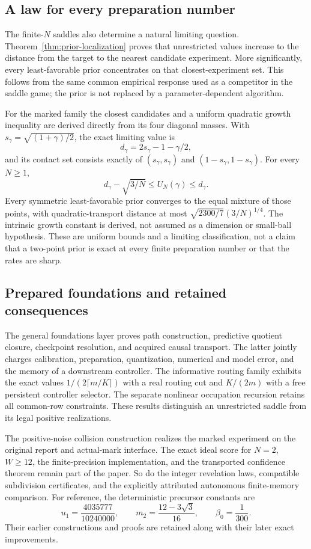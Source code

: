 \subsection{A law for every preparation number}
The finite-$N$ saddles also determine a natural limiting question.
Theorem~\ref{thm:prior-localization} proves that unrestricted values
increase to the distance from the target to the nearest candidate
experiment. More significantly, every least-favorable prior concentrates
on that closest-experiment set. This follows from the same common
empirical response used as a competitor in the saddle game; the prior
is not replaced by a parameter-dependent algorithm.

For the marked family the closest candidates and a uniform quadratic
growth inequality are derived directly from its four diagonal masses.
With $s_\gamma=\sqrt{(1+\gamma)/2}$, the exact limiting value is
\[
 d_\gamma=2s_\gamma-1-\gamma/2,
\]
and its contact set consists exactly of $(s_\gamma,s_\gamma)$ and
$(1-s_\gamma,1-s_\gamma)$. For every $N\ge1$,
\[
 d_\gamma-\sqrt{3/N}\le U_N(\gamma)\le d_\gamma.
\]
Every symmetric least-favorable prior converges to the equal mixture of
those points, with quadratic-transport distance at most
$\sqrt{2300/7}(3/N)^{1/4}$. The intrinsic growth constant is derived,
not assumed as a dimension or small-ball hypothesis. These are uniform
bounds and a limiting classification, not a claim that a two-point
prior is exact at every finite preparation number or that the rates
are sharp.

\subsection{Prepared foundations and retained consequences}
The general foundations layer proves path construction, predictive
quotient closure, checkpoint resolution, and acquired causal transport.
The latter jointly charges calibration, preparation, quantization,
numerical and model error, and the memory of a downstream controller.
The informative routing family exhibits the exact values
$1/(2\lceil m/K\rceil)$ with a real routing cut and $K/(2m)$ with a
free persistent controller selector. The separate nonlinear occupation
recursion retains all common-row constraints. These results distinguish
an unrestricted saddle from its legal positive realizations.

The positive-noise collision construction realizes the marked experiment
on the original report and actual-mark interface. The exact ideal score
for $N=2$, $W\ge12$, the finite-precision implementation, and the
transported confidence theorem remain part of the paper. So do the
integer revelation laws, compatible subdivision certificates, and the
explicitly attributed autonomous finite-memory comparison. For reference,
the deterministic precursor constants are
\begin{equation}\label{eq:constants}
 u_1=\frac{4035777}{10240000},\qquad
 m_2=\frac{12-3\sqrt3}{16},\qquad\beta_0=\frac1{300}.
\end{equation}
Their earlier constructions and proofs are retained along with their
later exact improvements.

